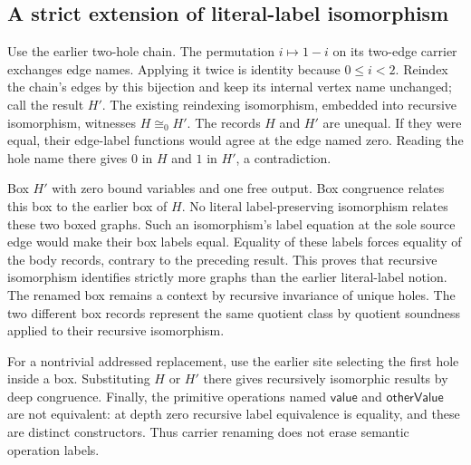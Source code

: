 \subsection{A strict extension of literal-label isomorphism}

Use the earlier two-hole chain. The permutation $i\mapsto 1-i$ on its two-edge
carrier exchanges edge names. Applying it twice is identity because
$0\leq i<2$. Reindex the chain's edges by this bijection and keep its internal
vertex name unchanged; call the result $H'$. The existing reindexing isomorphism,
embedded into recursive isomorphism, witnesses $H\cong_0 H'$.
The records $H$ and $H'$ are unequal. If they were equal, their edge-label
functions would agree at the edge named zero. Reading the hole name there gives
$0$ in $H$ and $1$ in $H'$, a contradiction.

Box $H'$ with zero bound variables and one free output. Box congruence relates
this box to the earlier box of $H$.
No literal label-preserving isomorphism relates these two boxed graphs. Such an
isomorphism's label equation at the sole source edge would make their box labels
equal. Equality of these labels forces equality of the body records, contrary
to the preceding result. This proves that recursive isomorphism identifies
strictly more graphs than the earlier literal-label notion.
The renamed box remains a context by recursive invariance of unique holes. The
two different box records represent the same quotient class by quotient
soundness applied to their recursive isomorphism.

For a nontrivial addressed replacement, use the earlier site selecting the first
hole inside a box. Substituting $H$ or $H'$ there gives recursively isomorphic
results by deep congruence. Finally, the primitive operations named
$\mathsf{value}$ and $\mathsf{otherValue}$ are not equivalent: at depth zero
recursive label equivalence is equality, and these are distinct constructors.
Thus carrier renaming does not erase semantic operation labels.
